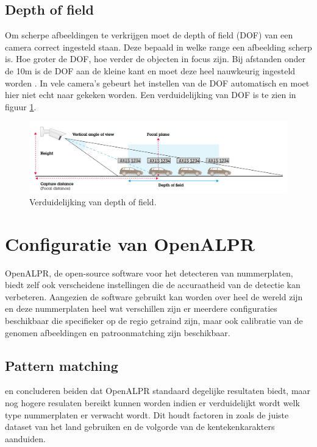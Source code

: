 \subsection{Depth of field}
Om scherpe afbeeldingen te verkrijgen moet de depth of field (DOF) van een camera correct ingesteld staan. Deze bepaald in welke range een afbeelding scherp is. Hoe groter de DOF, hoe verder de objecten in focus zijn. Bij afstanden onder de 10m is de DOF aan de kleine kant en moet deze heel nauwkeurig ingesteld worden \autocite{axis2019license}. In vele camera's gebeurt het instellen van de DOF automatisch en moet hier niet echt naar gekeken worden. Een verduidelijking van DOF is te zien in figuur \ref{fig:dof}.

\begin{figure}[h!]
	\centering
	\includegraphics[width=\linewidth]{img/depth-of-field.png}
	\caption{Verduidelijking van depth of field. \autocite{axis2019license}}
	\label{fig:dof}
\end{figure}


\section{Configuratie van OpenALPR}

OpenALPR, de open-source software voor het detecteren van nummerplaten, biedt zelf ook verscheidene instellingen die de accuraatheid van de detectie kan verbeteren. Aangezien de software gebruikt kan worden over heel de wereld zijn en deze nummerplaten heel wat verschillen zijn er meerdere configuraties beschikbaar die specifieker op de regio getraind zijn, maar ook calibratie van de genomen afbeeldingen en patroonmatching zijn beschikbaar.

\subsection{Pattern matching}
\textcite{arrieta2019prototype} en \textcite{buhus2016automatic} concluderen beiden dat OpenALPR standaard degelijke resultaten biedt, maar nog hogere resulaten bereikt kunnen worden indien er verduidelijkt wordt welk type nummerplaten er verwacht wordt. Dit houdt factoren in zoals de juiste dataset van het land gebruiken en de volgorde van de kentekenkarakters aanduiden.

